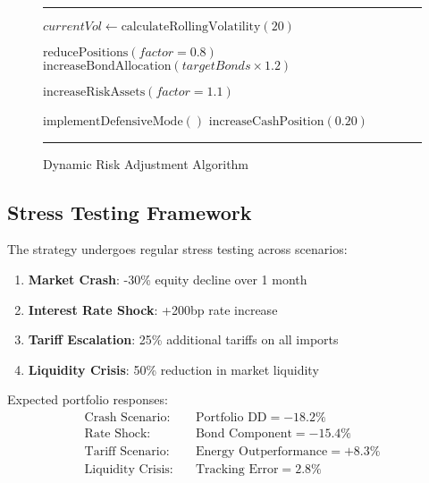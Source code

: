 \documentclass[onecolumn,11pt]{IEEEtran}
\renewenvironment{algorithm}[1][h]
  {\begin{figure}[#1]
   \centering
   \begin{minipage}{0.9\textwidth}
   \hrule
   \vspace{0.3em}}
  {\vspace{0.3em}
   \hrule
   \end{minipage}
   \end{figure}}
\begin{document}
\begin{algorithm}[h]
\caption{Dynamic Risk Adjustment Algorithm}
\label{alg:risk_adjustment}
\begin{algorithmic}[1]
    \State $currentVol \gets \text{calculateRollingVolatility}(20)$ 
    
        \State $\text{reducePositions}(factor = 0.8)$ 
        \State $\text{increaseBondAllocation}(targetBonds \times 1.2)$
    \EndIf
    
        \State $\text{increaseRiskAssets}(factor = 1.1)$ 
    \EndIf
    
     
        \State $\text{implementDefensiveMode}()$
        \State $\text{increaseCashPosition}(0.20)$
    \EndIf
\EndFunction
\end{algorithmic}
\end{algorithm}

\subsection{Stress Testing Framework}

The strategy undergoes regular stress testing across scenarios:

\begin{enumerate}
    \item \textbf{Market Crash}: -30\% equity decline over 1 month
    \item \textbf{Interest Rate Shock}: +200bp rate increase
    \item \textbf{Tariff Escalation}: 25\% additional tariffs on all imports
    \item \textbf{Liquidity Crisis}: 50\% reduction in market liquidity
\end{enumerate}

Expected portfolio responses:
\begin{align}
\text{Crash Scenario:} &\quad \text{Portfolio DD} = -18.2\% \\
\text{Rate Shock:} &\quad \text{Bond Component} = -15.4\% \\
\text{Tariff Scenario:} &\quad \text{Energy Outperformance} = +8.3\% \\
\text{Liquidity Crisis:} &\quad \text{Tracking Error} = 2.8\%
\end{align}
\end{document}
